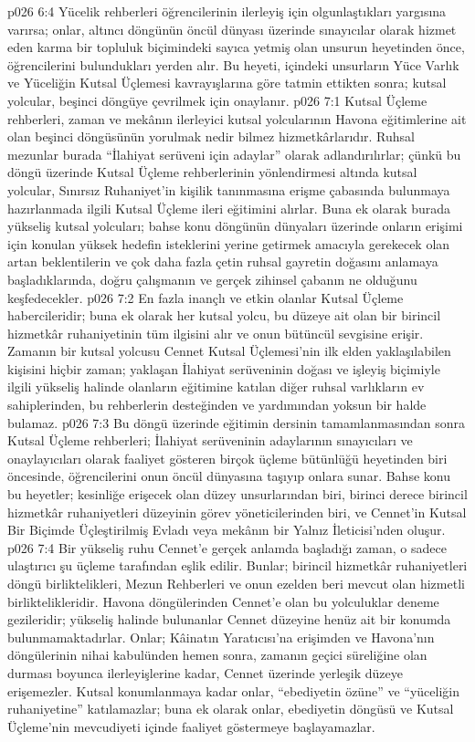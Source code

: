 \vs p026 6:4 Yücelik rehberleri öğrencilerinin ilerleyiş için olgunlaştıkları yargısına varırsa; onlar, altıncı döngünün öncül dünyası üzerinde sınayıcılar olarak hizmet eden karma bir topluluk biçimindeki sayıca yetmiş olan unsurun heyetinden önce, öğrencilerini bulundukları yerden alır. Bu heyeti, içindeki unsurların Yüce Varlık ve Yüceliğin Kutsal Üçlemesi kavrayışlarına göre tatmin ettikten sonra; kutsal yolcular, beşinci döngüye çevrilmek için onaylanır.
\vs p026 7:1 Kutsal Üçleme rehberleri, zaman ve mekânın ilerleyici kutsal yolcularının Havona eğitimlerine ait olan beşinci döngüsünün yorulmak nedir bilmez hizmetkârlarıdır. Ruhsal mezunlar burada “İlahiyat serüveni için adaylar” olarak adlandırılırlar; çünkü bu döngü üzerinde Kutsal Üçleme rehberlerinin yönlendirmesi altında kutsal yolcular, Sınırsız Ruhaniyet’in kişilik tanınmasına erişme çabasında bulunmaya hazırlanmada ilgili Kutsal Üçleme ileri eğitimini alırlar. Buna ek olarak burada yükseliş kutsal yolcuları; bahse konu döngünün dünyaları üzerinde onların erişimi için konulan yüksek hedefin isteklerini yerine getirmek amacıyla gerekecek olan artan beklentilerin ve çok daha fazla çetin ruhsal gayretin doğasını anlamaya başladıklarında, doğru çalışmanın ve gerçek zihinsel çabanın ne olduğunu keşfedecekler.
\vs p026 7:2 En fazla inançlı ve etkin olanlar Kutsal Üçleme habercileridir; buna ek olarak her kutsal yolcu, bu düzeye ait olan bir birincil hizmetkâr ruhaniyetinin tüm ilgisini alır ve onun bütüncül sevgisine erişir. Zamanın bir kutsal yolcusu Cennet Kutsal Üçlemesi’nin ilk elden yaklaşılabilen kişisini hiçbir zaman; yaklaşan İlahiyat serüveninin doğası ve işleyiş biçimiyle ilgili yükseliş halinde olanların eğitimine katılan diğer ruhsal varlıkların ev sahiplerinden, bu rehberlerin desteğinden ve yardımından yoksun bir halde bulamaz.
\vs p026 7:3 Bu döngü üzerinde eğitimin dersinin tamamlanmasından sonra Kutsal Üçleme rehberleri; İlahiyat serüveninin adaylarının sınayıcıları ve onaylayıcıları olarak faaliyet gösteren birçok üçleme bütünlüğü heyetinden biri öncesinde, öğrencilerini onun öncül dünyasına taşıyıp onlara sunar. Bahse konu bu heyetler; kesinliğe erişecek olan düzey unsurlarından biri, birinci derece birincil hizmetkâr ruhaniyetleri düzeyinin görev yöneticilerinden biri, ve Cennet’in Kutsal Bir Biçimde Üçleştirilmiş Evladı veya mekânın bir Yalnız İleticisi’nden oluşur.
\vs p026 7:4 Bir yükseliş ruhu Cennet’e gerçek anlamda başladığı zaman, o sadece ulaştırıcı şu üçleme tarafından eşlik edilir. Bunlar; birincil hizmetkâr ruhaniyetleri döngü birliktelikleri, Mezun Rehberleri ve onun ezelden beri mevcut olan hizmetli birliktelikleridir. Havona döngülerinden Cennet’e olan bu yolculuklar deneme gezileridir; yükseliş halinde bulunanlar Cennet düzeyine henüz ait bir konumda bulunmamaktadırlar. Onlar; Kâinatın Yaratıcısı’na erişimden ve Havona’nın döngülerinin nihai kabulünden hemen sonra, zamanın geçici süreliğine olan durması boyunca ilerleyişlerine kadar, Cennet üzerinde yerleşik düzeye erişemezler. Kutsal konumlanmaya kadar onlar, “ebediyetin özüne” ve “yüceliğin ruhaniyetine” katılamazlar; buna ek olarak onlar, ebediyetin döngüsü ve Kutsal Üçleme’nin mevcudiyeti içinde faaliyet göstermeye başlayamazlar.
